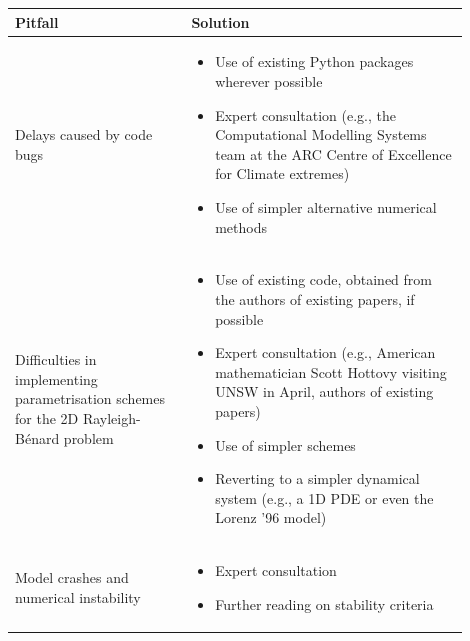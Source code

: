 \documentclass[titlepage]{article}
\newcommand{\rb}{Rayleigh-B\'{e}nard}
\begin{document}
\begin{table}[ht]
    \centering
    \begin{tabular}%
        {>{\raggedright\arraybackslash}p{0.35\linewidth}%
        >{\raggedright\arraybackslash}p{0.55\linewidth}
        }
        \toprule
        \textbf{Pitfall}  & \textbf{Solution} \\
        \midrule
        \vspace{\parskip} Delays caused by code bugs & %
        \begin{itemize}[parsep=0pt,itemsep=3pt,topsep=0pt,leftmargin=14pt]
            \item Use of existing Python packages wherever possible
            \item Expert consultation (e.g., the Computational Modelling
                Systems team at the ARC Centre of Excellence for Climate
                extremes)
            \item Use of simpler alternative numerical methods
        \end{itemize} \\
        Difficulties in implementing parametrisation schemes for the 2D \rb{}
        problem & %
        \vspace{-\topsep}
        \begin{itemize}[parsep=0pt,itemsep=3pt,topsep=0pt,leftmargin=14pt]
            \item Use of existing code, obtained from the authors of existing
                papers, if possible
            \item Expert consultation (e.g., American mathematician Scott
                Hottovy visiting UNSW in April, authors of existing papers)
            \item Use of simpler schemes
            \item Reverting to a simpler dynamical system (e.g., a 1D PDE or
                even the Lorenz '96 model)
        \end{itemize} \\
        Model crashes and numerical instability & %
        \vspace{-\topsep}
        \begin{itemize}[parsep=0pt,itemsep=3pt,topsep=0pt,leftmargin=14pt]
            \item Expert consultation
            \item Further reading on stability criteria

\end{itemize}
\end{tabular}
\end{table}
\end{document}
